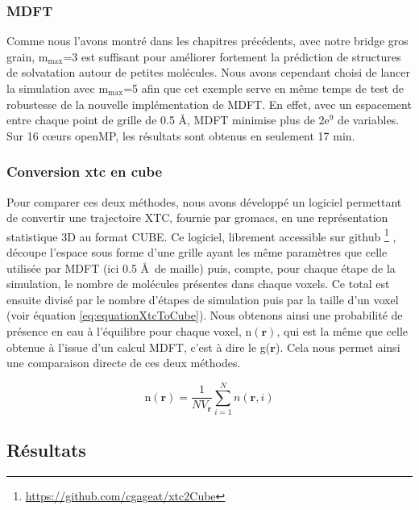 \subsubsection{MDFT}
Comme nous l'avons montré dans les chapitres précédents, avec notre bridge gros grain, $\mathrm{m}_\mathrm{max}$=3 est suffisant pour améliorer fortement la prédiction de structures de solvatation autour de petites molécules. Nous avons cependant choisi de lancer la simulation avec $\mathrm{m}_\mathrm{max}$=5 afin que cet exemple serve en même temps de test de robustesse de la nouvelle implémentation de MDFT. En effet, avec un espacement entre chaque point de grille de 0.5 \AA, MDFT minimise plus de $2\mathrm{e}^9$ de variables. Sur 16 cœurs openMP, les résultats sont obtenus en seulement 17 min.


\subsubsection{Conversion xtc en cube}
Pour comparer ces deux méthodes, nous avons développé un logiciel permettant de convertir une trajectoire XTC, fournie par gromacs, en une représentation statistique 3D au format CUBE. Ce logiciel, librement accessible sur github \footnote{\url{https://github.com/cgageat/xtc2Cube}} , découpe l'espace sous forme d'une grille ayant les même paramètres que celle utilisée par MDFT (ici 0.5 \AA\ de maille) puis, compte, pour chaque étape de la simulation, le nombre de molécules présentes dans chaque voxels. Ce total est ensuite divisé par le nombre d'étapes de simulation puis par la taille d'un voxel (voir équation \ref{eq:equationXtcToCube}). Nous obtenons ainsi une probabilité de présence en eau à l'équilibre pour chaque voxel, $\mathrm{n}\left(\boldsymbol{r}\right)$, qui est la même que celle obtenue à l'issue d'un calcul MDFT, c'est à dire le g($\boldsymbol{r}$). Cela nous permet ainsi une comparaison directe de ces deux méthodes.

\begin{equation}\label{eq:equationXtcToCube}
\mathrm{n}\left(\boldsymbol{r}\right) = \frac{1}{NV_{\boldsymbol{r}}}\sum\limits_{i=1}^N n(\boldsymbol{r}, i)
\end{equation}
 

\subsection{Résultats}
